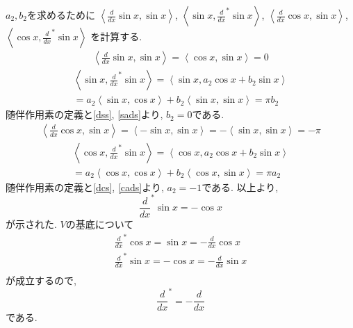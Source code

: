 \documentclass[a4paper,11pt]{jsarticle}
\begin{document}
$a_2, b_2$を求めるために 
$\left<\frac{d}{dx}\sin{x}, \sin{x}\right>$,
$\left<\sin{x}, \frac{d}{dx}^*\sin{x}\right>$,
$\left<\frac{d}{dx}\cos{x}, \sin{x}\right>$,
$\left<\cos{x}, \frac{d}{dx}^*\sin{x}\right>$
を計算する.
\begin{eqnarray}
  \left<\frac{d}{dx}\sin{x}, \sin{x}\right>
  = \left<\cos{x}, \sin{x}\right>
  = 0 \label{dss}
\end{eqnarray}
\begin{equation}
  \begin{split}
    \left<\sin{x}, \frac{d}{dx}^*\sin{x}\right>
    = \left<\sin{x}, a_2\cos{x} + b_2\sin{x}\right> \\
    = a_2\left<\sin{x}, \cos{x}\right> + b_2\left<\sin{x}, \sin{x}\right>
    = \pi b_2
  \end{split}
  \label{sads}
\end{equation}
随伴作用素の定義と\eqref{dss}, \eqref{sads}より, $b_2=0$である.
\begin{eqnarray}
  \left<\frac{d}{dx}\cos{x}, \sin{x}\right>
  = \left<-\sin{x}, \sin{x}\right>
  = -\left<\sin{x}, \sin{x}\right>
  = -\pi \label{dcs}
\end{eqnarray}
\begin{equation}
  \begin{split}
    \left<\cos{x}, \frac{d}{dx}^*\sin{x}\right>
    = \left<\cos{x}, a_2\cos{x} + b_2\sin{x}\right> \\
    = a_2\left<\cos{x}, \cos{x}\right> + b_2\left<\cos{x}, \sin{x}\right>
    = \pi a_2
  \end{split}
  \label{cads}
\end{equation}
随伴作用素の定義と\eqref{dcs}, \eqref{cads}より, $a_2=-1$である.
以上より, 
\[
  \frac{d}{dx}^*\sin{x} = -\cos{x}
\]
が示された. $V$の基底について
\begin{eqnarray*}
  \frac{d}{dx}^*\cos{x} = \sin{x} = -\frac{d}{dx}\cos{x} \\
  \frac{d}{dx}^*\sin{x} = -\cos{x} = -\frac{d}{dx}\sin{x} \\
\end{eqnarray*}
が成立するので, 
\[
  \frac{d}{dx}^* = -\frac{d}{dx}
\]
である.
\end{document}
